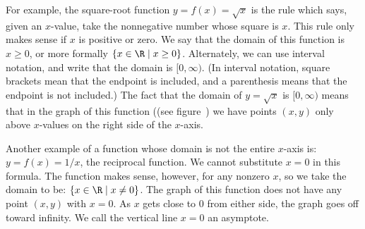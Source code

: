 
For example, the square-root function $y=f(x)=\sqrt{x}$ is the rule
which says, given an $x$-value, take the nonnegative number whose
square is $x$.  This rule only makes sense if $x$ is positive or zero.
We say that the domain of this function is $x\ge 0$, or more formally
$\{x\in\R\mid x\ge 0\}$.  Alternately, we
can use interval notation, and write that the domain is $[0,\infty)$.
(In interval notation, square brackets mean that the endpoint is
included, and a parenthesis means that the endpoint is not included.)
The fact that the domain of $y=\sqrt{x}$ is $[0,\infty)$ means that in the
graph of this function ((see figure~)
we have points $(x,y)$ only above $x$-values on the right side of the
$x$-axis.


Another example of a function whose domain is not the entire $x$-axis
is: $y=f(x)=1/x$, the reciprocal function.  We cannot substitute $x=0$
in this formula.  The function makes sense, however, for any nonzero
$x$, so we take the domain to be: $\{x\in\R\mid x\ne 0\}$.  The graph
of this function does not have any point $(x,y)$ with $x=0$.  As $x$
gets close to 0 from either side, the graph goes off toward infinity.
We call the vertical line $x=0$ an {\dfont
  asymptote}.

